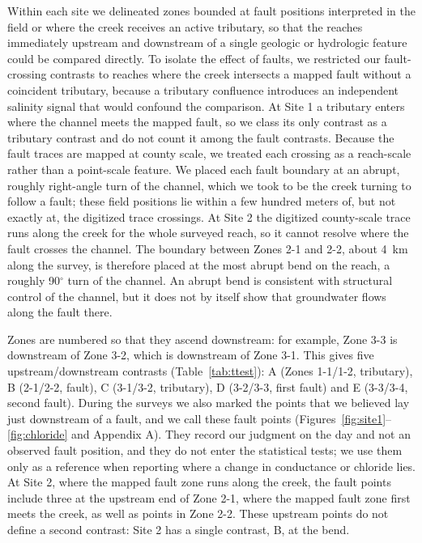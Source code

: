 \documentclass{article}
\begin{document}
Within each site we delineated zones bounded at fault positions interpreted in the field or where the creek receives an active tributary, so that the reaches immediately upstream and downstream of a single geologic or hydrologic feature could be compared directly. To isolate the effect of faults, we restricted our fault-crossing contrasts to reaches where the creek intersects a mapped fault without a coincident tributary, because a tributary confluence introduces an independent salinity signal that would confound the comparison. At Site 1 a tributary enters where the channel meets the mapped fault, so we class its only contrast as a tributary contrast and do not count it among the fault contrasts. Because the fault traces are mapped at county scale, we treated each crossing as a reach-scale rather than a point-scale feature. We placed each fault boundary at an abrupt, roughly right-angle turn of the channel, which we took to be the creek turning to follow a fault; these field positions lie within a few hundred meters of, but not exactly at, the digitized trace crossings. At Site 2 the digitized county-scale trace runs along the creek for the whole surveyed reach, so it cannot resolve where the fault crosses the channel. The boundary between Zones 2-1 and 2-2, about 4~km along the survey, is therefore placed at the most abrupt bend on the reach, a roughly 90$^{\circ}$ turn of the channel. An abrupt bend is consistent with structural control of the channel, but it does not by itself show that groundwater flows along the fault there.

Zones are numbered so that they ascend downstream: for example, Zone 3-3 is downstream of Zone 3-2, which is downstream of Zone 3-1. This gives five upstream/downstream contrasts (Table~\ref{tab:ttest}): A (Zones 1-1/1-2, tributary), B (2-1/2-2, fault), C (3-1/3-2, tributary), D (3-2/3-3, first fault) and E (3-3/3-4, second fault). During the surveys we also marked the points that we believed lay just downstream of a fault, and we call these fault points (Figures~\ref{fig:site1}--\ref{fig:chloride} and Appendix A). They record our judgment on the day and not an observed fault position, and they do not enter the statistical tests; we use them only as a reference when reporting where a change in conductance or chloride lies. At Site 2, where the mapped fault zone runs along the creek, the fault points include three at the upstream end of Zone 2-1, where the mapped fault zone first meets the creek, as well as points in Zone 2-2. These upstream points do not define a second contrast: Site 2 has a single contrast, B, at the bend.
\end{document}
